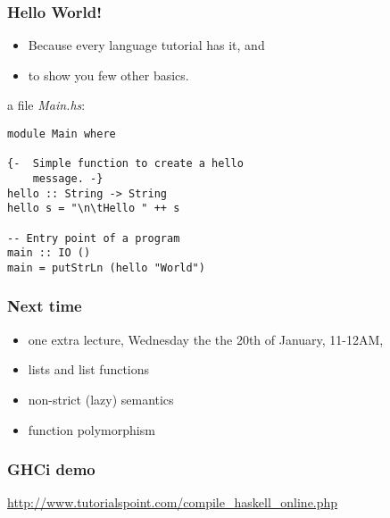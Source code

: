 \documentclass[pdftex,landscape,final,handout,british]{beamer}
\begin{document}
\begin{frame}[fragile]
    \frametitle{Hello World!}

    \begin{itemize}
        \item Because every language tutorial has it, and
        \item to show you few other basics.
    \end{itemize}

    \pause

    a file \emph{Main.hs}:
    \begin{verbatim}
module Main where

{-  Simple function to create a hello 
    message. -}
hello :: String -> String
hello s = "\n\tHello " ++ s

-- Entry point of a program
main :: IO ()
main = putStrLn (hello "World")
    \end{verbatim}
\end{frame}

\begin{frame}
    \frametitle{Next time}

    \begin{itemize}
        \item one extra lecture, Wednesday the the 20th of January, 11-12AM,
            { \color{red}{Wolfson LT, QMB} }

        \item lists and list functions
        \item non-strict (lazy) semantics
        \item function polymorphism

    \end{itemize}

\end{frame}


\begin{frame}
  \frametitle{GHCi demo}
  \url{http://www.tutorialspoint.com/compile_haskell_online.php}
\end{frame}

%
\end{document}
